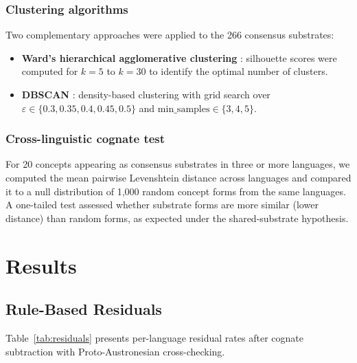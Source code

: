 \documentclass[12pt]{article}
\begin{document}
\subsubsection{Clustering algorithms}

Two complementary approaches were applied to the 266 consensus substrates:

\begin{itemize}
    \item \textbf{Ward's hierarchical agglomerative clustering} \citep{ward1963}: silhouette scores were computed for $k = 5$ to $k = 30$ to identify the optimal number of clusters.
    \item \textbf{DBSCAN} \citep{ester1996}: density-based clustering with grid search over $\varepsilon \in \{0.3, 0.35, 0.4, 0.45, 0.5\}$ and $\mathrm{min\_samples} \in \{3, 4, 5\}$.
\end{itemize}

\subsubsection{Cross-linguistic cognate test}

For 20 concepts appearing as consensus substrates in three or more languages, we computed the mean pairwise Levenshtein distance across languages and compared it to a null distribution of 1,000 random concept forms from the same languages.
A one-tailed test assessed whether substrate forms are more similar (lower distance) than random forms, as expected under the shared-substrate hypothesis.

\section{Results}

\subsection{Rule-Based Residuals}
\label{sec:results_e022}

Table~\ref{tab:residuals} presents per-language residual rates after cognate subtraction with Proto-Austronesian cross-checking.
\end{document}
